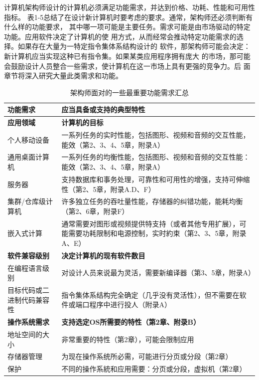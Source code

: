 计算机架构师设计的计算机必须满足功能需求，并达到价格、功耗、性能和可用性指标。
表1-5总结了在设计新计算机时要考虑的要求。通常，架构师还必须判断有什么样的功能要求，
其中哪一项可能是主要任务。需求可能是由市场驱动的特定功能。应用软件决定了计算机的使
用方式，从而经常会推动特定功能需求的选择。如果存在大量为一特定指令集体系结构设计的
软件，那架构师可能会决定：新计算机应当实现这种已有指令集。如果某类应用程序拥有庞大
的市场，那可能会鼓励设计人员整合一些需求，使计算机在这一市场上具有更强的竞争力。后
面章节将深入研究大量此类需求和功能。
\begin{table}[]
    \scriptsize
    \centering
    \caption{架构师面对的一些最重要功能需求汇总}
    \begin{tabular}{C{0.15\textwidth}C{0.7\textwidth}}
    \hline
    \textbf{功能需求}         & \textbf{应当具备或支持的典型特性} \\ \hline
    \textbf{应用领域}         & \textbf{计算机的目标} \\
    个人移动设备         & 一系列任务的实时性能，包括图形、视频和音频的交互性能，能效（第2、3、4、5章，附录A） \\
    通用桌面计算机         & 一系列任务的均衡性能，包括图形、视频和音频的交互性能：能效（第2、3、4、5章，附录A） \\
    服务器         & 支持数据库和事务处理，可靠性和可用性的增强，支持可伸缩性（第2、5章，附录A.D、F） \\
    集群/仓库级计算机         & 许多独立任务的吞吐量性能，存储器的纠错功能，能耗均衡（第2、6章，附录F） \\
    嵌入式计算         & 通常需要对图形或视频提供特支持（或者其他专用扩展），可能需要功耗限制和电源控制，实时約束（第2、3、5章，附录A、E） \\ \hline

    \textbf{软件兼容级别}         & \textbf{决定计算机的现有软件数目} \\
    在编程语言级别         & 对设计人员来说最为灵活，需要新编译器（第3、5章，附录A） \\
    目标代码或二进制代码兼容性         & 指令集体系结构完全确定（几乎没有灵活性），但不需要在软件或端口程序中进行投人（附录A） \\ \hline

    \textbf{操作系统需求}         & \textbf{支持选定OS所需要的特性（第2章、附录B）} \\
    地址空间的大小         & 非常重要的特性（第2章），可能会限制应用 \\
    存储器管理         & 为现在操作系统所必需，可能进行分页或分段（第2章） \\
    保护         & 不同的操作系統和应用需要：分页或分段，虚拟机（第2章） \\ \hline


\end{tabular}
\end{table}
